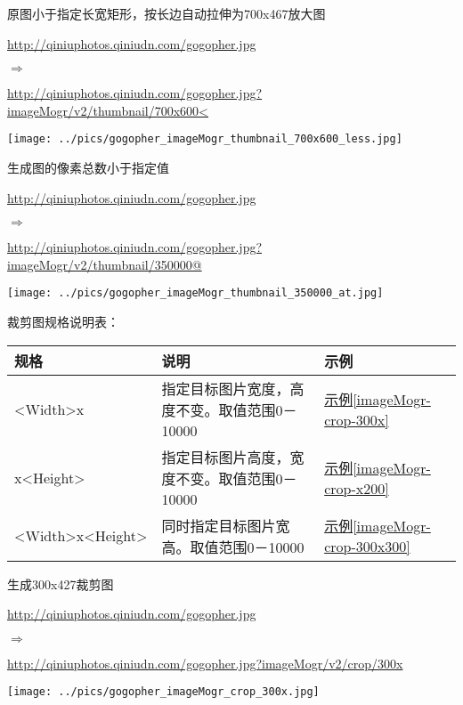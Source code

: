 \documentclass[11pt, oneside]{book}
\newcommand{\qpar}[1]{
\vspace{0.25em}
\noindent
#1\par
\vspace{0.25em}
}
\newcommand{\qurl}[1]{\url{#1}}
\newcommand{\qtable}[1]{\footnotesize\vspace{0.5em}#1\vspace{0.5em}\normalsize}
\begin{document}
\begin{CJK*}{UTF8}{song}
\begin{sample}
  \caption{原图小于指定长宽矩形，按长边自动拉伸为700x467放大图}
    \qpar{\qurl{http://qiniuphotos.qiniudn.com/gogopher.jpg}}
    \qpar{$\Rightarrow$}
    \qpar{\qurl{http://qiniuphotos.qiniudn.com/gogopher.jpg?imageMogr/v2/thumbnail/700x600<}}

    \begin{center}
      \texttt{[image: ../pics/gogopher\_imageMogr\_thumbnail\_700x600\_less.jpg]}
    \end{center}
  \label{imageMogr-thumbnail-700x600-less}
\end{sample}

\begin{sample}
  \caption{生成图的像素总数小于指定值}
    \qpar{\qurl{http://qiniuphotos.qiniudn.com/gogopher.jpg}}
    \qpar{$\Rightarrow$}
    \qpar{\qurl{http://qiniuphotos.qiniudn.com/gogopher.jpg?imageMogr/v2/thumbnail/350000@}}

    \begin{center}
      \texttt{[image: ../pics/gogopher\_imageMogr\_thumbnail\_350000\_at.jpg]}
    \end{center}
  \label{imageMogr-thumbnail-350000-at}
\end{sample}

\qpar{裁剪图规格说明表：}
\qtable{
\label{crop-spec}
\begin{tabular}[t]{|l|p{22em}|p{5em}|}
\hline
规格 & 说明 & 示例 \\
\hline
\textless Width\textgreater x & 指定目标图片宽度，高度不变。取值范围0－10000 & \hyperref[imageMogr-crop-300x]{示例\ref*{imageMogr-crop-300x}} \\
\hline
x\textless Height\textgreater & 指定目标图片高度，宽度不变。取值范围0－10000 & \hyperref[imageMogr-crop-x200]{示例\ref*{imageMogr-crop-x200}} \\
\hline
\textless Width\textgreater x\textless Height\textgreater & 同时指定目标图片宽高。取值范围0－10000 & \hyperref[imageMogr-crop-300x300]{示例\ref*{imageMogr-crop-300x300}} \\
\hline
\end{tabular}
}

\begin{sample}
  \caption{生成300x427裁剪图}
    \qpar{\qurl{http://qiniuphotos.qiniudn.com/gogopher.jpg}}
    \qpar{$\Rightarrow$}
    \qpar{\qurl{http://qiniuphotos.qiniudn.com/gogopher.jpg?imageMogr/v2/crop/300x}}

    \begin{center}
      \texttt{[image: ../pics/gogopher\_imageMogr\_crop\_300x.jpg]}
    \end{center}
  \label{imageMogr-crop-300x}
\end{sample}


\end{CJK*}
\end{document}
